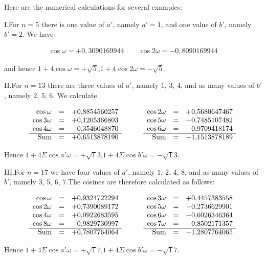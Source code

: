 Here are the numerical calculations for several examples:

I.\quad For $n=5$ there is one value of $a'$, namely $a'=1$, and one value of $b'$, namely $b'=2$. We have

\[
\begin{aligned}
\cos\omega=+0{,}3090169944\qquad\cos2\omega=-0{,}8090169944
\end{aligned}
\]

and hence $1+4\cos\omega=+\surd5$,\quad $1+4\cos2\omega=-\surd5$.

II.\quad For $n=13$ there are three values of $a'$, namely $1$, $3$, $4$, and as many values of $b'$, namely $2$, $5$, $6$. We calculate

{\small\setlength{\arraycolsep}{2.5pt}\renewcommand{\arraystretch}{1.15}
\[
\begin{array}{rclcrcl}
\cos\omega&=&+0{,}8854560257&\qquad&\cos2\omega&=&+0{,}5680647467\\
\cos3\omega&=&+0{,}1205366803&\qquad&\cos5\omega&=&-0{,}7485107482\\
\cos4\omega&=&-0{,}3546048870&\qquad&\cos6\omega&=&-0{,}9709418174\\\cline{1-3}\cline{5-7}
\text{Sum}&=&+0{,}6513878190&\qquad&\text{Sum}&=&-1{,}1513878189
\end{array}
\]
}

Hence $1+4\Sigma\cos a'\omega=+\surd13$,\quad $1+4\Sigma\cos b'\omega=-\surd13$.

III.\quad For $n=17$ we have four values of $a'$, namely $1$, $2$, $4$, $8$, and as many values of $b'$, namely $3$, $5$, $6$, $7$.\quad The cosines are therefore calculated as follows:

{\small\setlength{\arraycolsep}{2.5pt}\renewcommand{\arraystretch}{1.15}
\[
\begin{array}{rclcrcl}
\cos\omega&=&+0{,}9324722294&\qquad&\cos3\omega&=&+0{,}4457383558\\
\cos2\omega&=&+0{,}7390089172&\qquad&\cos5\omega&=&-0{,}2736629901\\
\cos4\omega&=&+0{,}0922683595&\qquad&\cos6\omega&=&-0{,}6026346364\\
\cos8\omega&=&-0{,}9829730997&\qquad&\cos7\omega&=&-0{,}8502171357\\\cline{1-3}\cline{5-7}
\text{Sum}&=&+0{,}7807764064&\qquad&\text{Sum}&=&-1{,}2807764065
\end{array}
\]
}

Hence $1+4\Sigma\cos a'\omega=+\surd17$,\quad $1+4\Sigma\cos b'\omega=-\surd17$.

